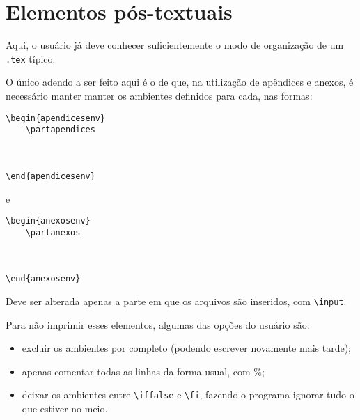 \section{Elementos pós-textuais}
Aqui, o usuário já deve conhecer suficientemente o modo de organização de um \texttt{.tex} típico.

O único adendo a ser feito aqui é o de que, na utilização de apêndices e anexos, é necessário manter manter os ambientes definidos para cada, nas formas:

\begin{verbatim}
\begin{apendicesenv}
    \partapendices
    
    
    
\end{apendicesenv}
\end{verbatim}

e

\begin{verbatim}
\begin{anexosenv}
    \partanexos
    
    
    
\end{anexosenv}
\end{verbatim}

Deve ser alterada apenas a parte em que os arquivos são inseridos, com \texttt{\textbackslash input}.

Para não imprimir esses elementos, algumas das opções do usuário são:

\begin{itemize}
    \item excluir os ambientes por completo (podendo escrever novamente mais tarde);
    \item apenas comentar todas as linhas da forma usual, com \%;
    \item deixar os ambientes entre \texttt{\textbackslash iffalse} e \texttt{\textbackslash fi}, fazendo o programa ignorar tudo o que estiver no meio.
\end{itemize}